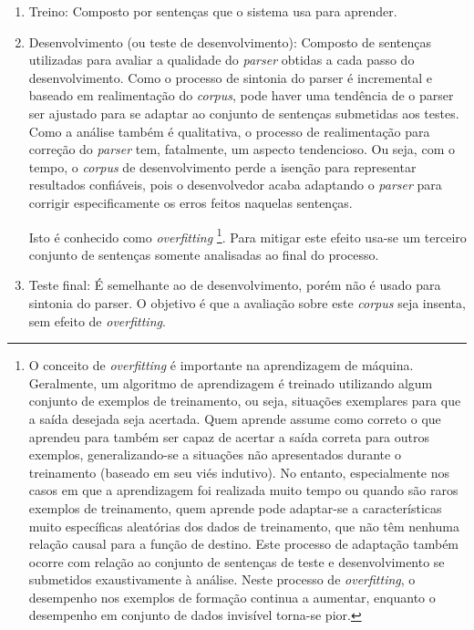 \begin{enumerate}

\item{Treino: Composto por sentenças que o sistema usa para aprender.} %
\label{sub:treino}

\item{Desenvolvimento (ou teste de desenvolvimento): Composto de sentenças utilizadas para avaliar a qualidade do \emph{parser} obtidas a cada passo do desenvolvimento. Como o processo de sintonia do parser é incremental e baseado em realimentação do \emph{corpus}, pode haver uma tendência de o parser ser ajustado para se adaptar ao conjunto de sentenças submetidas aos testes. Como a análise também é qualitativa, o processo de realimentação para correção do \emph{parser} tem, fatalmente, um aspecto tendencioso. Ou seja, com o tempo, o \emph{corpus} de desenvolvimento perde a isenção para representar resultados confiáveis, pois o desenvolvedor acaba adaptando o \emph{parser} para corrigir especificamente os erros feitos naquelas sentenças. 

Isto é conhecido como \emph{overfitting} \footnote{O conceito de \emph{overfitting} \cite{everitt2002cambridge} é importante na aprendizagem de máquina. Geralmente, um algoritmo de aprendizagem é treinado utilizando algum conjunto de exemplos de treinamento, ou seja, situações exemplares para que a saída desejada seja acertada. Quem aprende assume como correto o que aprendeu para também ser capaz de acertar a saída correta para outros exemplos, generalizando-se a situações não apresentados durante o treinamento (baseado em seu viés indutivo). No entanto, especialmente nos casos em que a aprendizagem foi realizada muito tempo ou quando são raros exemplos de treinamento, quem aprende pode adaptar-se a características muito específicas aleatórias dos dados de treinamento, que não têm nenhuma relação causal para a função de destino. Este processo de adaptação também ocorre com relação ao conjunto de sentenças de teste e desenvolvimento se submetidos exaustivamente à análise. Neste processo de \emph{overfitting}, o desempenho nos exemplos de formação continua a aumentar, enquanto o desempenho em conjunto de dados invisível torna-se pior.}. Para mitigar este efeito usa-se um terceiro conjunto de sentenças somente analisadas ao final do processo.} 

\label{sub:desenvolvimento_ou_teste_de_desenvolvimento_}

\item{Teste final: É semelhante ao de desenvolvimento, porém não é usado para sintonia do parser. O objetivo é que a avaliação sobre este \emph{corpus} seja insenta, sem efeito de \emph{overfitting}.}
\label{sub:teste_final}
\end{enumerate}


